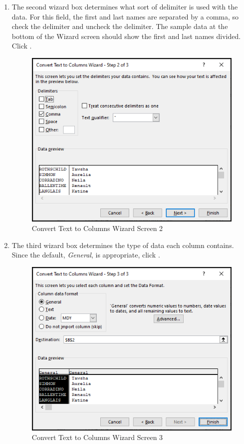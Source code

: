 \begin{enumerate}
	\item The second wizard box determines what sort of delimiter is used with the data. For this field, the first and last names are separated by a comma, so check the  delimiter and uncheck the  delimiter. The sample data at the bottom of the Wizard screen should show the first and last names divided. Click .

	\begin{figure}[H]
		\centering
		\includegraphics[width=\maxwidth{.75\linewidth}]{gfx/ch09_fig31}
		\caption{Convert Text to Columns Wizard Screen 2}
		\label{09:fig31}
	\end{figure}

	\item The third wizard box determines the type of data each column contains. Since the default, \textit{General}, is appropriate, click .

	\begin{figure}[H]
		\centering
		\includegraphics[width=\maxwidth{.75\linewidth}]{gfx/ch09_fig32}
		\caption{Convert Text to Columns Wizard Screen 3}
		\label{09:fig32}
	\end{figure}


\end{enumerate}

